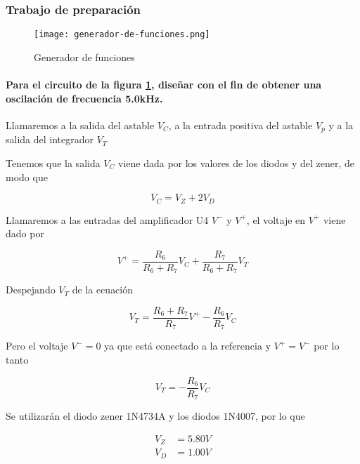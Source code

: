 \subsubsection{Trabajo de preparación}

\begin{figure}[ht]
    \centering
    \texttt{[image: generador-de-funciones.png]}
    \caption{Generador de funciones}
    \label{fig:generador-funciones}
\end{figure}

\paragraph{Para el circuito de la figura \ref{fig:generador-funciones}, diseñar con el fin de obtener una oscilación de frecuencia 5.0kHz.\\}

Llamaremos a la salida del astable $V_{C}$, a la entrada positiva del astable $V_p$ y a la salida del integrador $V_{T}$

Tenemos que la salida $V_{C}$ viene dada por los valores de los diodos y del zener, de modo que 

\begin{equation}
    V_{C} = V_{Z} + 2 V_{D}
\end{equation}

Llamaremos a las entradas del amplificador U4 $V^-$ y $V^+$, el voltaje en $V^+$ viene dado por

\begin{equation*}
    V^+ = \frac{R_6}{R_6 + R_7} V_C + \frac{R_7}{R_6 + R_7} V_T
\end{equation*}

Despejando $V_T$ de la ecuación

\begin{equation*}
    V_T = \frac{R_6 + R_7}{R_7} V^+ - \frac{R_6}{R_7} V_C
\end{equation*}

Pero el voltaje $V^- = 0$ ya que está conectado a la referencia y $V^+ = V^-$ por lo tanto

\begin{equation}
    V_T = - \frac{R_6}{R_7} V_C
\end{equation}

Se utilizarán el diodo zener 1N4734A y los diodos 1N4007, por lo que

\begin{align*}
    V_Z &= 5.80 V \\
    V_D &= 1.00 V
\end{align*}

